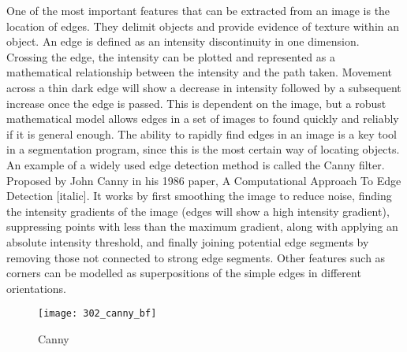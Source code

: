 One of the most important features that can be extracted from an image is the location of edges. They delimit objects and provide evidence of texture within an object. An edge is defined as an intensity discontinuity in one dimension. Crossing the edge, the intensity can be plotted and represented as a mathematical relationship between the intensity and the path taken. Movement across a thin dark edge will show a decrease in intensity followed by a subsequent increase once the edge is passed. This is dependent on the image, but a robust mathematical model allows edges in a set of images to found quickly and reliably if it is general enough. The ability to rapidly find edges in an image is a key tool in a segmentation program, since this is the most certain way of locating objects. An example of a widely used edge detection method is called the Canny filter. Proposed by John Canny in his 1986 paper, A Computational Approach To Edge Detection [italic]. It works by first smoothing the image to reduce noise, finding the intensity gradients of the image (edges will show a high intensity gradient), suppressing points with less than the maximum gradient, along with applying an absolute intensity threshold, and finally joining potential edge segments by removing those not connected to strong edge segments. Other features such as corners can be modelled as superpositions of the simple edges in different orientations.

\begin{figure}[p]
 \centering
 \texttt{[image: 302\_canny\_bf]}
 \caption{
 	Canny
 }
 \label{fig:canny}
\end{figure}

